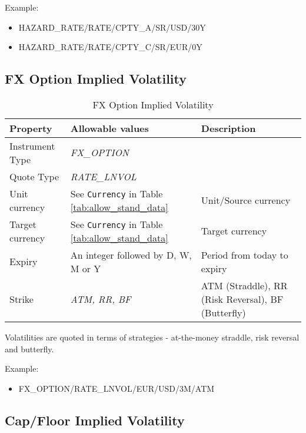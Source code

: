 Example:
\begin{itemize}
\item {HAZARD\_RATE/RATE/CPTY\_A/SR/USD/30Y}
\item{HAZARD\_RATE/RATE/CPTY\_C/SR/EUR/0Y}
\end{itemize}

\subsection{FX Option Implied Volatility}

\begin{table}[H]
\centering
\begin{tabular}{|p{3cm}|p{3.5cm}|p{7cm}|}
\hline
{\bf Property} & {\bf Allowable values} & {\bf Description} \\
\hline
  Instrument Type & \emph{FX\_OPTION} & \\ \hline
  Quote Type & \emph{RATE\_LNVOL} & \\ \hline
  Unit currency & See \lstinline!Currency! in Table \ref{tab:allow_stand_data}& Unit/Source currency\\ \hline
  Target currency & See \lstinline!Currency! in Table \ref{tab:allow_stand_data} & Target currency\\ \hline
  Expiry & An integer followed by D, W, M or Y & Period from today to expiry \\ \hline
  Strike & \emph{ATM, RR, BF} & ATM (Straddle), RR (Risk Reversal), BF (Butterfly) \\
\hline
\end{tabular}
  \caption{FX Option Implied Volatility}
  \label{tab:fximplvol_quote}
\end{table}

Volatilities are quoted in terms of strategies - at-the-money straddle, risk reversal and butterfly.

\medskip
Example:
\begin{itemize}
\item {FX\_OPTION/RATE\_LNVOL/EUR/USD/3M/ATM}
\end{itemize}

\subsection{Cap/Floor Implied Volatility}\label{ss:capfloor_impl_vol_quote}

